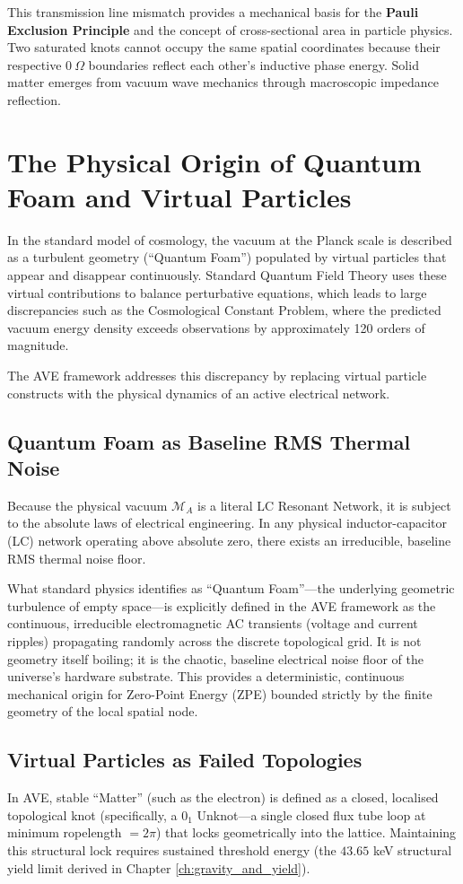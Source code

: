 This transmission line mismatch provides a mechanical basis for the \textbf{Pauli Exclusion Principle} and the concept of cross-sectional area in particle physics. Two saturated knots cannot occupy the same spatial coordinates because their respective $0 \ \Omega$ boundaries reflect each other's inductive phase energy. Solid matter emerges from vacuum wave mechanics through macroscopic impedance reflection.

\section{The Physical Origin of Quantum Foam and Virtual Particles}
In the standard model of cosmology, the vacuum at the Planck scale is described as a turbulent geometry (``Quantum Foam'') populated by virtual particles that appear and disappear continuously. Standard Quantum Field Theory uses these virtual contributions to balance perturbative equations, which leads to large discrepancies such as the Cosmological Constant Problem, where the predicted vacuum energy density exceeds observations by approximately 120 orders of magnitude.

The AVE framework addresses this discrepancy by replacing virtual particle constructs with the physical dynamics of an active electrical network.

\subsection{Quantum Foam as Baseline RMS Thermal Noise}
Because the physical vacuum $\mathcal{M}_A$ is a literal LC Resonant Network, it is subject to the absolute laws of electrical engineering. In any physical inductor-capacitor (LC) network operating above absolute zero, there exists an irreducible, baseline RMS thermal noise floor. 

What standard physics identifies as ``Quantum Foam''---the underlying geometric turbulence of empty space---is explicitly defined in the AVE framework as the continuous, irreducible electromagnetic AC transients (voltage and current ripples) propagating randomly across the discrete topological grid. It is not geometry itself boiling; it is the chaotic, baseline electrical noise floor of the universe's hardware substrate. This provides a deterministic, continuous mechanical origin for Zero-Point Energy (ZPE) bounded strictly by the finite geometry of the local spatial node.

\subsection{Virtual Particles as Failed Topologies}
In AVE, stable ``Matter'' (such as the electron) is defined as a closed, localised topological knot (specifically, a $0_1$ Unknot---a single closed flux tube loop at minimum ropelength $= 2\pi$) that locks geometrically into the lattice. Maintaining this structural lock requires sustained threshold energy (the $43.65$ keV structural yield limit derived in Chapter \ref{ch:gravity_and_yield}).


